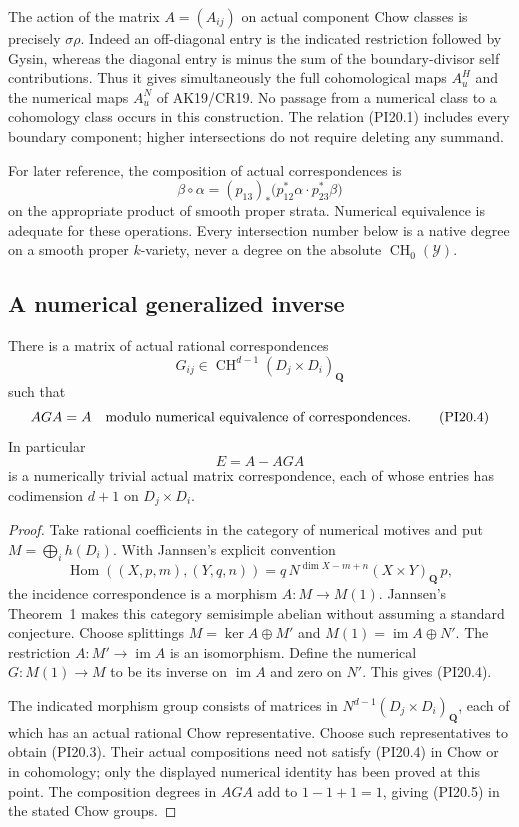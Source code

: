 The action of the matrix $A=(A_{ij})$ on actual component Chow
classes is precisely $\sigma\rho$.  Indeed an off-diagonal entry is
the indicated restriction followed by Gysin, whereas the diagonal
entry is minus the sum of the boundary-divisor self contributions.
Thus it gives simultaneously the full cohomological maps $A^H_u$
and the numerical maps $A^N_u$ of AK19/CR19.  No passage from a
numerical class to a cohomology class occurs in this construction.
The relation (PI20.1) includes every boundary component; higher
intersections do not require deleting any summand.

For later reference, the composition of actual correspondences is
\[
 \beta\circ\alpha
   =(p_{13})_*\bigl(p_{12}^*\alpha\cdot p_{23}^*\beta\bigr)
 \tag{PI20.2}\label{r20pi:composition}
\]
on the appropriate product of smooth proper strata.  Numerical
equivalence is adequate for these operations.  Every intersection
number below is a native degree on a smooth proper $k$-variety,
never a degree on the absolute $\operatorname{CH}_0(\mathcal Y)$.

\subsection{A numerical generalized inverse}

\begin{lemma}
\label{r20pi:numericalinverse}
There is a matrix of actual rational correspondences
\[
 G_{ij}\in\operatorname{CH}^{d-1}(D_j\times D_i)_{\mathbf Q}
 \tag{PI20.3}\label{r20pi:G}
\]
such that
\[
                         AGA=A
       \quad\hbox{modulo numerical equivalence of correspondences}.
 \tag{PI20.4}\label{r20pi:numidentity}
\]
In particular
\[
                         E=A-AGA
 \tag{PI20.5}\label{r20pi:error}
\]
is a numerically trivial actual matrix correspondence, each of whose
entries has codimension $d+1$ on $D_j\times D_i$.
\end{lemma}

\begin{proof}
Take rational coefficients in the category of numerical motives and
put $M=\bigoplus_i h(D_i)$.  With Jannsen's explicit convention
\[
 \operatorname{Hom}((X,p,m),(Y,q,n))
       =q\,N^{\dim X-m+n}(X\times Y)_{\mathbf Q}\,p,
\]
the incidence correspondence is a morphism $A:M\to M(1)$.
Jannsen's Theorem~1 makes this category semisimple abelian without
assuming a standard conjecture.  Choose splittings
$M=\ker A\oplus M'$ and $M(1)=\operatorname{im}A\oplus N'$.
The restriction $A:M'\to\operatorname{im}A$ is an isomorphism.
Define the numerical $G:M(1)\to M$ to be its inverse on
$\operatorname{im}A$ and zero on $N'$.  This gives (PI20.4).

The indicated morphism group consists of matrices in
$N^{d-1}(D_j\times D_i)_{\mathbf Q}$, each of which has an
actual rational Chow representative.  Choose such representatives
to obtain (PI20.3).  Their actual compositions need not satisfy
(PI20.4) in Chow or in cohomology; only the displayed numerical
identity has been proved at this point.  The composition degrees
in $AGA$ add to $1-1+1=1$, giving (PI20.5) in the stated Chow
groups.
\end{proof}

